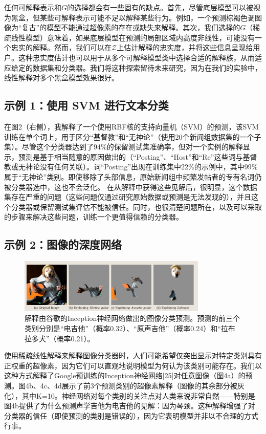 \documentclass[12pt, a4paper]{ctexart} %
\begin{document}
任何可解释表示和\(G\)的选择都会有一些固有的缺点。首先，尽管底层模型可以被视为黑盒，但某些可解释表示可能不足以解释某些行为。例如，一个预测棕褐色调图像为“复古”的模型不能通过超像素的存在或缺失来解释。其次，我们选择的\(G\)（稀疏线性模型）意味着，如果底层模型在预测的局部区域内高度非线性，可能没有一个忠实的解释。然而，我们可以在\(\mathcal{Z}\)上估计解释的忠实度，并将这些信息呈现给用户。这种忠实度估计也可以用于从多个可解释模型类中选择合适的解释族，从而适应给定的数据集和分类器。我们将这种探索留待未来研究，因为在我们的实验中，线性解释对多个黑盒模型效果很好。

\subsection{示例 1：使用 SVM 进行文本分类}
在图2（右侧），我解释了一个使用RBF核的支持向量机（SVM）的预测，该SVM训练在单个词上，用于区分“基督教”和“无神论”（使用20个新闻组数据集的一个子集）。尽管这个分类器达到了94\%的保留测试集准确率，但对一个实例的解释显示，预测是基于相当随意的原因做出的（“Posting”、“Host”和“Re”这些词与基督教或无神论没有任何关联）。词“Posting”出现在训练集中22\%的示例中，其中99\%属于“无神论”类别。即使移除了头部信息，原始新闻组中频繁发帖者的专有名词仍被分类器选中，这也不会泛化。
在从解释中获得这些见解后，很明显，这个数据集存在严重的问题（这些问题仅通过研究原始数据或预测是无法发现的），并且这个分类器或保留测试集评估不能被信任。同时，也很清楚问题所在，以及可以采取的步骤来解决这些问题，训练一个更值得信赖的分类器。

\subsection{示例 2：图像的深度网络}
\begin{figure}[h]
    \centering
    \includegraphics[width=0.8\textwidth]{img/img_4.png}
    \caption{解释由谷歌的Inception神经网络做出的图像分类预测。预测的前三个类别分别是“电吉他”（概率0.32）、“原声吉他”（概率0.24）和“拉布拉多犬”（概率0.21）。}
\end{figure}
使用稀疏线性解释来解释图像分类器时，人们可能希望仅突出显示对特定类别具有正权重的超像素，因为它们可以直观地说明模型为何认为该类别可能存在。我们以这种方式解释了Google预训练的Inception神经网络[25]对任意图像（图4a）的预测。图4b、4c、4d展示了前3个预测类别的超像素解释（图像的其余部分被灰化），其中K=10。神经网络对每个类别的关注点对人类来说非常自然——特别是图4b提供了为什么预测声学吉他为电吉他的见解：因为琴颈。这种解释增强了对分类器的信任（即使预测的类别是错误的），因为它表明模型并非以不合理的方式行事。
\end{document}
